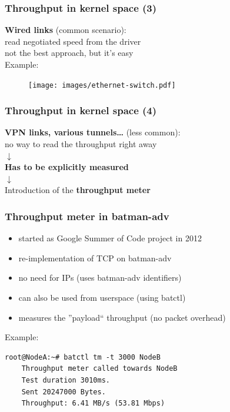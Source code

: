 \documentclass[slidestop]{beamer}
\begin{document}
\begin{frame}[c]
	\frametitle{Throughput in kernel space (3)}
	\begin{center}
	\textbf{Wired links} (common scenario):\\
	read negotiated speed from the driver\\[0.5cm]
	\pause
	not the best approach, but it's easy\\[0.3cm]
	Example:
	\begin{figure}
		\centering
		\texttt{[image: images/ethernet-switch.pdf]}
	\end{figure}
	\end{center}
\end{frame}

\begin{frame}
	\frametitle{Throughput in kernel space (4)}
	\begin{center}
	\textbf{VPN links, various tunnels\dots} (less common):\\
	no way to read the throughput right away\\[0.1cm]
	$\downarrow$\\[0.5cm]
	\textbf{Has to be explicitly measured}\\[0.5cm]
	\pause
	$\downarrow$\\[0.5cm]
	Introduction of the \textbf{throughput meter}
	\end{center}
\end{frame}

\begin{frame}[c,fragile]
	\frametitle{Throughput meter in batman-adv}
	\begin{itemize}
		\item started as Google Summer of Code project in 2012
		\item re-implementation of TCP on batman-adv
		\item no need for IPs (uses batman-adv identifiers)
		\item can also be used from userspace (using batctl)
		\item measures the ''payload`` throughput (no packet overhead)
	\end{itemize}
	\addvspace{0.5cm}
	Example:\\
	\begin{lstlisting}[basicstyle=\scriptsize]
	root@NodeA:~# batctl tm -t 3000 NodeB
	Throughput meter called towards NodeB
	Test duration 3010ms.
	Sent 20247000 Bytes.
	Throughput: 6.41 MB/s (53.81 Mbps)
	\end{lstlisting}
\end{frame}
\end{document}
